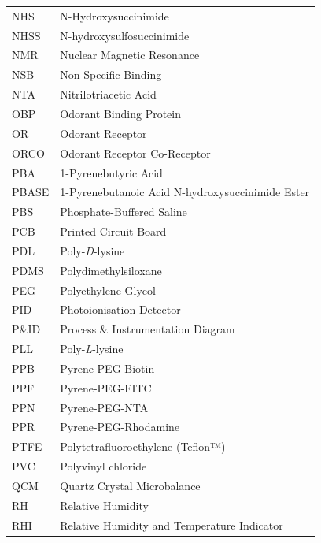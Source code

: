 \documentclass[
  a4paper,
]{scrbook}
\begin{document}
\begin{spacing}{1.2}
\newpage
\fancyhf{} %
\thispagestyle{fancy} %
\renewcommand{\headrulewidth}{0pt}
\fancyfoot[R]{\thepage} %
\begin{table}[H]
  \begin{tabular}{@{}p{} p{}@{}}  %
    NHS  & N-Hydroxysuccinimide  \\[5pt]
    NHSS  & N-hydroxysulfosuccinimide   \\[5pt]
    NMR  & Nuclear Magnetic Resonance  \\[5pt]
    NSB  & Non-Specific Binding   \\[5pt]
    NTA  & Nitrilotriacetic Acid   \\[5pt]
    OBP  & Odorant Binding Protein  \\[5pt]
    OR  & Odorant Receptor  \\[5pt]
    ORCO  & Odorant Receptor Co-Receptor  \\[5pt]
    PBA  & 1-Pyrenebutyric Acid  \\[5pt]
    PBASE  & 1-Pyrenebutanoic Acid N-hydroxysuccinimide Ester  \\[5pt]
    PBS  & Phosphate-Buffered Saline  \\[5pt]
    PCB  & Printed Circuit Board   \\[5pt]
    PDL & Poly-\textit{D}-lysine  \\[5pt]
    PDMS  & Polydimethylsiloxane   \\  [5pt]
    PEG  & Polyethylene Glycol  \\[5pt] 
    PID  & Photoionisation Detector  \\[5pt]
    P\&ID & Process \& Instrumentation Diagram  \\[5pt]
    PLL  & Poly-\textit{L}-lysine  \\[5pt]
    PPB  & Pyrene-PEG-Biotin  \\[5pt]
    PPF  & Pyrene-PEG-FITC  \\[5pt]
    PPN  & Pyrene-PEG-NTA  \\[5pt]
    PPR  & Pyrene-PEG-Rhodamine  \\[5pt]
    PTFE  & Polytetrafluoroethylene (Teflon™)  \\[5pt]
    PVC  & Polyvinyl chloride  \\[5pt]
    QCM  & Quartz Crystal Microbalance  \\[5pt]
    RH  & Relative Humidity  \\[5pt]
    RHI  & Relative Humidity and Temperature Indicator  \\[5pt] 
  \end{tabular}
\end{table}


\end{spacing}
\end{document}
